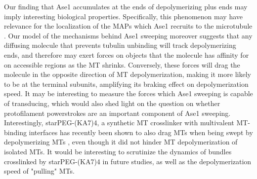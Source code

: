 Our finding that Ase1 accumulates at the ends of depolymerizing plus ends may imply interesting biological properties. Specifically, this phenomenon may have relevance for the localization of the MAPs which Ase1 recruits to the microtubule . Our model of the mechanisms behind Ase1 sweeping moreover suggests that any diffusing molecule that prevents tubulin unbinding will track depolymerizing ends, and therefore may exert forces on objects that the molecule has affinity for on accessible regions as the MT shrinks. Conversely, these forces will drag the molecule in the opposite direction of MT depolymerization, making it more likely to be at the terminal subunits, amplifying its braking effect on depolymerization speed. It may be interesting to measure the forces which Ase1 sweeping is capable of transducing, which would also shed light on the question on whether protofilament powerstrokes are an important component of Ase1 sweeping. Interestingly, starPEG-(KA7)4, a synthetic MT crosslinker with multivalent MT-binding interfaces has recently been shown to also drag MTs when being swept by depolymerizing MTs \parencite{Drechsler2019}, even though it did not hinder MT depolymerization of isolated MTs. It would be interesting to scrutinize the dynamics of bundles crosslinked by starPEG-(KA7)4 in future studies, as well as the depolymerization speed of "pulling" MTs. \par
 
